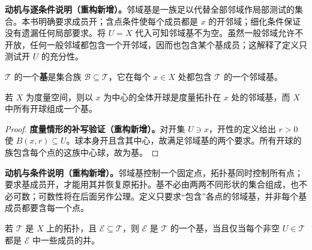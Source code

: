 \documentclass[../../main.tex]{subfiles}%
\begin{document}
\begin{remark}
\textbf{动机与逐条件说明（重构新增）。}邻域基是一族足以代替全部邻域作局部测试的集合。本书明确要求成员开；含点条件使每个成员都是 $x$ 的开邻域；细化条件保证没有遗漏任何局部要求。将 $U=X$ 代入可知邻域基不为空。虽然一般邻域允许不开放，任何一般邻域都包含一个开邻域，因而也包含某个基成员；这解释了定义只测试开 $U$ 的充分性。
\end{remark}
\begin{definition}[拓扑的基]\label{definition:ch04-topology-base}
$\mathcal T$ 的一个\textbf{基}是集合族 $\mathcal B\subseteq\mathcal T$，它在每个 $x\in X$ 处都包含 $\mathcal T$ 的一个邻域基。
\end{definition}
\begin{example}\label{example:ch04-metric-bases}
若 $X$ 为度量空间，则以 $x$ 为中心的全体开球是度量拓扑在 $x$ 处的邻域基，而 $X$ 中所有开球组成一个基。
\end{example}
\begin{proof}
\textbf{度量情形的补写验证（重构新增）。}对开集 $U\ni x$，开性的定义给出 $r>0$ 使 $B(x,r)\subseteq U$。球本身开且含其中心，故满足邻域基的两个要求。所有开球的族包含每个点的这族中心球，故为基。
\end{proof}
\begin{remark}
\textbf{动机与条件说明（重构新增）。}邻域基控制一个固定点，拓扑基同时控制所有点；要求基成员开，才能用其并恢复原拓扑。基不必由两两不同形状的集合组成，也不必可数；可数性将在后面另作公理。定义只要求“包含”各点的邻域基，并非每个基成员都要含每一个点。
\end{remark}
\begin{proposition}\label{proposition:ch04-base-union-characterization}
若 $\mathcal T$ 是 $X$ 上的拓扑，且 $\mathcal E\subseteq\mathcal T$，则 $\mathcal E$ 是 $\mathcal T$ 的一个基，当且仅当每个非空 $U\in\mathcal T$ 都是 $\mathcal E$ 中一些成员的并。
\end{proposition}
\end{document}
